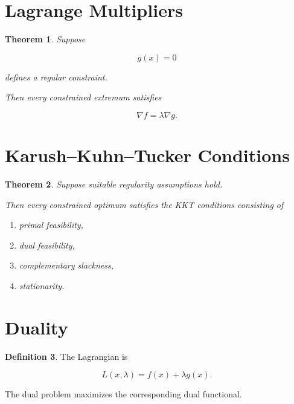 \documentclass[11pt]{book}
\numberwithin{equation}{chapter}
\theoremstyle{definition}
\newtheorem{definition}{Definition}[chapter]
\theoremstyle{plain}
\newtheorem{theorem}[definition]{Theorem}
\begin{document}

\section{Lagrange Multipliers}

\begin{theorem}

Suppose

\[
g(x)=0
\]

defines a regular constraint.

Then every constrained extremum satisfies

\[
\nabla f
=
\lambda
\nabla g.
\]

\end{theorem}


\section{Karush--Kuhn--Tucker Conditions}

\begin{theorem}

Suppose suitable regularity assumptions hold.

Then every constrained optimum satisfies the KKT conditions consisting
of

\begin{enumerate}

\item primal feasibility,

\item dual feasibility,

\item complementary slackness,

\item stationarity.

\end{enumerate}

\end{theorem}


\section{Duality}

\begin{definition}

The Lagrangian is

\[
L(x,\lambda)
=
f(x)
+
\lambda g(x).
\]

The dual problem maximizes the corresponding dual functional.

\end{definition}
\end{document}
